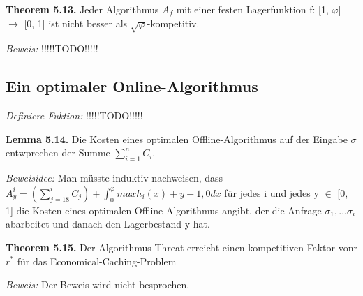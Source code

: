 \textbf{Theorem 5.13.} Jeder Algorithmus $A_{f}$ mit einer festen Lagerfunktion f: [1, $\varphi$] $\to$ [0, 1] ist nicht besser als $\sqrt{\varphi}$-kompetitiv.

\textit{Beweis:} !!!!!TODO!!!!!

\subsection{Ein optimaler Online-Algorithmus}

\textit{Definiere Fuktion:} !!!!!TODO!!!!!

\textbf{Lemma 5.14.} Die Kosten eines optimalen Offline-Algorithmus auf der Eingabe $\sigma$ entwprechen der Summe $\sum_{i=1}^{n} C_{i}$.

\textit{Beweisidee:} Man müsste induktiv nachweisen, dass $A_{y}^{i} = (\sum_{j=18}^{i} C_{j} ) + \int_{0}^{\varphi} max{h_{i}(x) + y - 1, 0} dx $ für jedes i und jedes y $\in$ [0, 1] die Kosten eines optimalen Offline-Algorithmus angibt, der die Anfrage $\sigma_{1}, ... \sigma_{i}$ abarbeitet und danach den Lagerbestand y hat.

\textbf{Theorem 5.15.} Der Algorithmus Threat erreicht einen kompetitiven Faktor vonr $r^{*}$ für das Economical-Caching-Problem

\textit{Beweis:} Der Beweis wird nicht besprochen.
